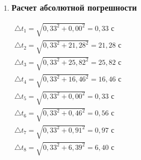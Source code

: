 \begin{enumerate}
		\item \subsubsection*{Расчет абсолютной погрешности}
		\label{appendix: 14}
		\begin{multicols}{2}
			\(\begin{aligned}\triangle t_1 = \sqrt{0,33^2 + 0,00^2} = 0,33 \text{ с}\end{aligned}\) \\
			\(\begin{aligned}\triangle t_2 = \sqrt{0,33^2 + 21,28^2} = 21,28 \text{ с}\end{aligned}\) \\
			\(\begin{aligned}\triangle t_3 = \sqrt{0,33^2 + 25,82^2} = 25,82 \text{ с}\end{aligned}\) \\
			\(\begin{aligned}\triangle t_4 = \sqrt{0,33^2 + 16,46^2} = 16,46 \text{ с}\end{aligned}\) \\
			\vfill
			\(\begin{aligned}\triangle t_5 = \sqrt{0,33^2 + 0,00^2} = 0,33 \text{ с}\end{aligned}\) \\
			\(\begin{aligned}\triangle t_6 = \sqrt{0,33^2 + 0,46^2} = 0,56 \text{ с}\end{aligned}\) \\
			\(\begin{aligned}\triangle t_7 = \sqrt{0,33^2 + 0,91^2} = 0,97 \text{ с}\end{aligned}\) \\
			\(\begin{aligned}\triangle t_8 = \sqrt{0,33^2 + 6,39^2} = 6,40 \text{ с}\end{aligned}\) \\
		\end{multicols}
	\end{enumerate}